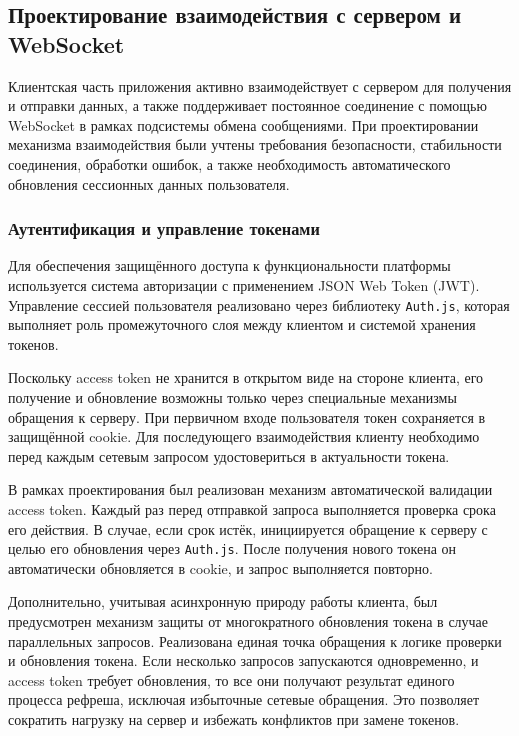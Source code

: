 \subsection{Проектирование взаимодействия с сервером и WebSocket}

Клиентская часть приложения активно взаимодействует с сервером для получения и отправки данных, а также поддерживает постоянное соединение с помощью WebSocket в рамках подсистемы обмена сообщениями. При проектировании механизма взаимодействия были учтены требования безопасности, стабильности соединения, обработки ошибок, а также необходимость автоматического обновления сессионных данных пользователя.

\subsubsection{Аутентификация и управление токенами}

Для обеспечения защищённого доступа к функциональности платформы используется система авторизации с применением JSON Web Token (JWT). Управление сессией пользователя реализовано через библиотеку \texttt{Auth.js}, которая выполняет роль промежуточного слоя между клиентом и системой хранения токенов.

Поскольку access token не хранится в открытом виде на стороне клиента, его получение и обновление возможны только через специальные механизмы обращения к серверу. При первичном входе пользователя токен сохраняется в защищённой cookie. Для последующего взаимодействия клиенту необходимо перед каждым сетевым запросом удостовериться в актуальности токена.

В рамках проектирования был реализован механизм автоматической валидации access token. Каждый раз перед отправкой запроса выполняется проверка срока его действия. В случае, если срок истёк, инициируется обращение к серверу с целью его обновления через \texttt{Auth.js}. После получения нового токена он автоматически обновляется в cookie, и запрос выполняется повторно.

Дополнительно, учитывая асинхронную природу работы клиента, был предусмотрен механизм защиты от многократного обновления токена в случае параллельных запросов. Реализована единая точка обращения к логике проверки и обновления токена. Если несколько запросов запускаются одновременно, и access token требует обновления, то все они получают результат единого процесса рефреша, исключая избыточные сетевые обращения. Это позволяет сократить нагрузку на сервер и избежать конфликтов при замене токенов.

